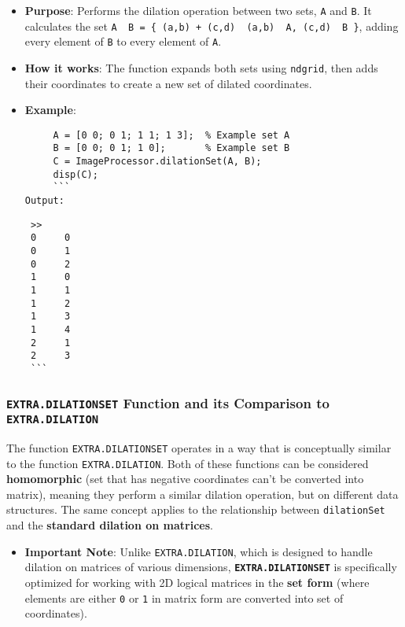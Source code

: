 \documentclass[11pt]{amsart}
\theoremstyle{remark}
\providecommand{\tightlist}{%
  \setlength{\itemsep}{0pt}\setlength{\parskip}{0pt}}
\theoremstyle{definition}
\theoremstyle{remark}
\numberwithin{equation}{section}
\begin{document}
\begin{itemize}
\item
  \textbf{Purpose}: Performs the dilation operation between two sets,
  \texttt{A} and \texttt{B}. It calculates the set
  \texttt{A\ \oplus \ B\ =\ \{\ (a,b)\ +\ (c,d)\ \textbar{}\ (a,b)\ \in\ A,\ (c,d)\ \in\ B\ \}},
  adding every element of \texttt{B} to every element of \texttt{A}.
\item
  \textbf{How it works}: The function expands both sets using
  \texttt{ndgrid}, then adds their coordinates to create a new set of
  dilated coordinates.
\item
  \textbf{Example}:

\begin{verbatim}
     A = [0 0; 0 1; 1 1; 1 3];  % Example set A
     B = [0 0; 0 1; 1 0];       % Example set B
     C = ImageProcessor.dilationSet(A, B);
     disp(C);
     ```
Output:
\end{verbatim}

\begin{verbatim}
 >> 
 0     0
 0     1
 0     2
 1     0
 1     1
 1     2
 1     3
 1     4
 2     1
 2     3
 ```
\end{verbatim}
\end{itemize}

\subsubsection{\texorpdfstring{\texttt{EXTRA.DILATIONSET} Function and
its Comparison to
\texttt{EXTRA.DILATION}}{EXTRA.DILATIONSET Function and its Comparison to EXTRA.DILATION}}\label{extra.dilationset-function-and-its-comparison-to-extra.dilation}

The function \texttt{EXTRA.DILATIONSET} operates in a way that is
conceptually similar to the function \texttt{EXTRA.DILATION}. Both of
these functions can be considered \textbf{homomorphic} (set that has
negative coordinates can't be converted into matrix), meaning they
perform a similar dilation operation, but on different data structures.
The same concept applies to the relationship between
\texttt{dilationSet} and the \textbf{standard dilation on matrices}.

\begin{itemize}
\tightlist
\item
  \textbf{Important Note}: Unlike \texttt{EXTRA.DILATION}, which is
  designed to handle dilation on matrices of various dimensions,
  \textbf{\texttt{EXTRA.DILATIONSET}} is specifically optimized for
  working with 2D logical matrices in the \textbf{set form} (where
  elements are either \texttt{0} or \texttt{1} in matrix form are
  converted into set of coordinates).
\end{itemize}
\end{document}

